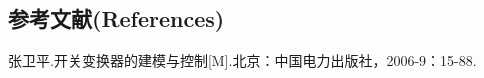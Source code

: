 \documentclass[UTF8,zihao=5,twoside]{ctexart}
\begin{document}
\begin{multicols}{2}
    \setcounter{secnumdepth}{-2}


    \section{\texorpdfstring{}{}参考文献(References)}
    \begin{thebibliography}{99}
        \vspace{-1.8em}
        \addtolength{\itemsep}{-0.7em}

        张卫平.\;\;开关变换器的建模与控制[M].\;\;北京：中国电力出版社，2006-9：15-88.

    \end{thebibliography}

    \end{multicols}

\end{document}
